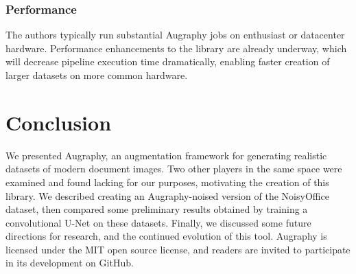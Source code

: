 \documentclass[runningheads]{article}
\begin{document}
\subsubsection{Performance}
\label{sec:org4b779de}
The authors typically run substantial Augraphy jobs on enthusiast or datacenter hardware. Performance enhancements to the library are already underway, which will decrease pipeline execution time dramatically, enabling faster creation of larger datasets on more common hardware.

\section{Conclusion}
\label{sec:org38b91e1}
We presented Augraphy, an augmentation framework for generating realistic datasets of modern document images. Two other players in the same space were examined and found lacking for our purposes, motivating the creation of this library. We described creating an Augraphy-noised version of the NoisyOffice dataset, then compared some preliminary results obtained by training a convolutional U-Net on these datasets. Finally, we discussed some future directions for research, and the continued evolution of this tool. Augraphy is licensed under the MIT open source license, and readers are invited to participate in its development on GitHub.
\end{document}
